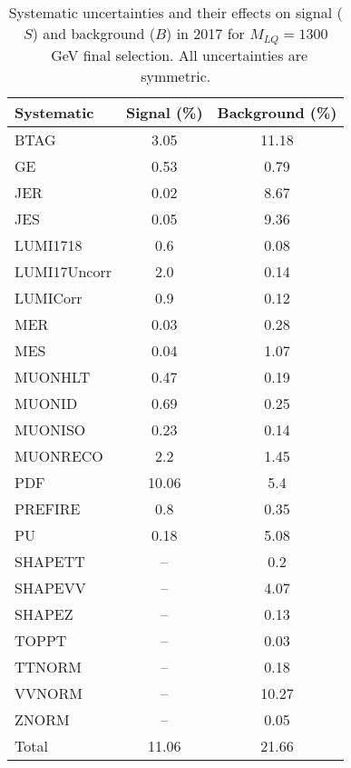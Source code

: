 \begin{table}[htbp]
\begin{center}
\caption{Systematic uncertainties and their effects on signal ($S$) and background ($B$) in 2017 for $M_{LQ}=1300$~GeV final selection. All uncertainties are symmetric.}
\begin{tabular}{lcc}
\hline\hline
Systematic & Signal (\%) & Background (\%) \\ \hline 
BTAG & 3.05 & 11.18\\ 
GE & 0.53 & 0.79\\ 
JER & 0.02 & 8.67\\ 
JES & 0.05 & 9.36\\ 
LUMI1718 & 0.6 & 0.08\\ 
LUMI17Uncorr & 2.0 & 0.14\\ 
LUMICorr & 0.9 & 0.12\\ 
MER & 0.03 & 0.28\\ 
MES & 0.04 & 1.07\\ 
MUONHLT & 0.47 & 0.19\\ 
MUONID & 0.69 & 0.25\\ 
MUONISO & 0.23 & 0.14\\ 
MUONRECO & 2.2 & 1.45\\ 
PDF & 10.06 & 5.4\\ 
PREFIRE & 0.8 & 0.35\\ 
PU & 0.18 & 5.08\\ 
SHAPETT & -- & 0.2\\ 
SHAPEVV & -- & 4.07\\ 
SHAPEZ & -- & 0.13\\ 
TOPPT & -- & 0.03\\ 
TTNORM & -- & 0.18\\ 
VVNORM & -- & 10.27\\ 
ZNORM & -- & 0.05\\ 
Total & 11.06 & 21.66\\ \hline \hline
\end{tabular}
\label{tab:SysUncertainties_uujj_1300}
\end{center}
\end{table}

